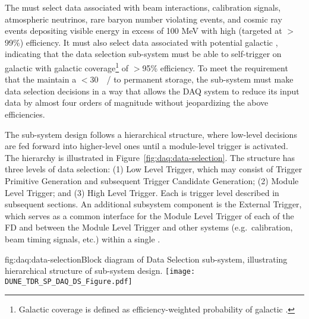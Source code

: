 The  must select data associated with beam interactions,
calibration signals, atmospheric neutrinos, rare baryon number violating events, and cosmic ray events depositing visible energy in excess of 100 MeV with high (targeted at $>$99\%) efficiency.
It must also select data associated with potential galactic , indicating that the data selection sub-system must be able to self-trigger on galactic  with galactic coverage\footnote{Galactic coverage is defined as efficiency-weighted probability of galactic .} of $>$95\% efficiency.
To meet the requirement that the   maintain a
$<$\SI{30}{\peta\byte/\year} to permanent storage, the 
sub-system must make data selection decisions in a way that allows the DAQ
system to reduce its input data by almost four orders of magnitude
without jeopardizing the above efficiencies.

The  sub-system design follows a hierarchical structure, where low-level
decisions are fed forward into higher-level ones until a  module-level trigger is activated. The hierarchy
is illustrated in Figure~\ref{fig:daq:data-selection}. The structure
has three levels of data selection: (1) Low Level Trigger, which may consist of
Trigger Primitive Generation and subsequent
Trigger Candidate Generation; (2) Module Level Trigger; and (3) High Level
Trigger. Each is trigger level described in subsequent
sections. An additional subsystem component is the External Trigger,
which serves as a common interface for the
Module Level Trigger of each of the FD  and between
the Module Level Trigger and other systems (e.g.~calibration, beam
timing signals, etc.) within a single .

\begin{dunefigure}{fig:daq:data-selection}{Block diagram of  
    Data Selection sub-system, illustrating hierarchical structure of
    sub-system design.}
  \texttt{[image: DUNE\_TDR\_SP\_DAQ\_DS\_Figure.pdf]}
\end{dunefigure}

